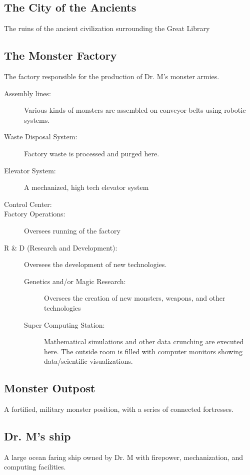 \documentclass{gd-document}
\begin{document}
\subsection{The City of the Ancients}

The ruins of the ancient civilization surrounding the Great Library

\subsection{The Monster Factory}

The factory responsible for the production of Dr. M's monster armies.

\begin{description}
\item[Assembly lines:] Various kinds of monsters are assembled on
  conveyor belts using robotic systems.
\item[Waste Disposal System:] Factory waste is processed and purged
  here.
\item[Elevator System:] A mechanized, high tech elevator system
\item[Control Center:]
\item[Factory Operations:] Oversees running of the factory
\item[R \& D (Research and Development):] Oversees the development of
new technologies. 

\begin{description}
\item[Genetics and/or Magic Research:] Oversees the creation of new
  monsters, weapons, and other technologies
\item[Super Computing Station:] Mathematical simulations and other
  data crunching are executed here. The outside room is filled with
  computer monitors showing data/scientific visualizations.
\end{description}
\end{description}

\subsection{Monster Outpost}

A fortified, military monster position, with a series of connected
fortresses.

\subsection{Dr. M's ship}

A large ocean faring ship owned by Dr. M with firepower,
mechanization, and computing facilities.
\end{document}

